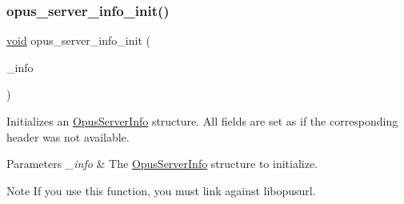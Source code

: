 \subsubsection{\texorpdfstring{opus\+\_\+server\+\_\+info\+\_\+init()}{opus\_server\_info\_init()}}
{\footnotesize\ttfamily \hyperlink{png_8h_ac9c84fa68bbad002983e35ce3663c686}{void} opus\+\_\+server\+\_\+info\+\_\+init (\begin{DoxyParamCaption}\item[{\hyperlink{struct_opus_server_info}{Opus\+Server\+Info} $\ast$}]{\+\_\+info }\end{DoxyParamCaption})}

Initializes an \hyperlink{struct_opus_server_info}{Opus\+Server\+Info} structure. All fields are set as if the corresponding header was not available. 
\begin{DoxyParams}{Parameters}
{\em \+\_\+info} & The \hyperlink{struct_opus_server_info}{Opus\+Server\+Info} structure to initialize. \\
\hline
\end{DoxyParams}
\begin{DoxyNote}{Note}
If you use this function, you must link against {\ttfamily libopusurl}. 
\end{DoxyNote}
